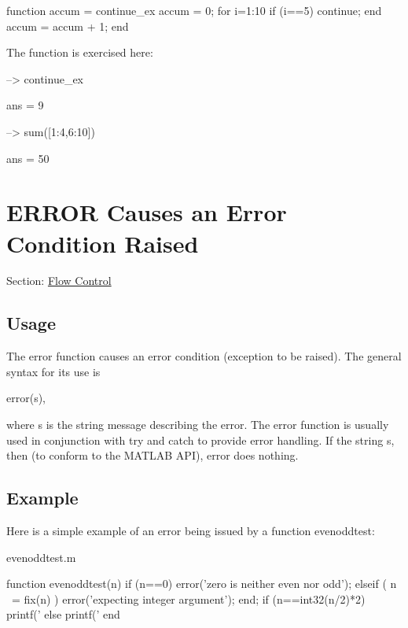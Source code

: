 \begin{DoxyVerbInclude}
function accum = continue_ex
  accum = 0;
  for i=1:10
    if (i==5)
      continue;
    end
    accum = accum + 1; %
  end
\end{DoxyVerbInclude}


The function is exercised here\-:


\begin{DoxyVerbInclude}
--> continue_ex

ans = 
 9 

--> sum([1:4,6:10])

ans = 
 50 
\end{DoxyVerbInclude}
 \hypertarget{flow_error}{}\section{E\-R\-R\-O\-R Causes an Error Condition Raised}\label{flow_error}
Section\-: \hyperlink{sec_flow}{Flow Control} \hypertarget{vtkwidgets_vtkxyplotwidget_Usage}{}\subsection{Usage}\label{vtkwidgets_vtkxyplotwidget_Usage}
The {\ttfamily error} function causes an error condition (exception to be raised). The general syntax for its use is \begin{DoxyVerb}   error(s),
\end{DoxyVerb}
 where {\ttfamily s} is the string message describing the error. The {\ttfamily error} function is usually used in conjunction with {\ttfamily try} and {\ttfamily catch} to provide error handling. If the string {\ttfamily s}, then (to conform to the M\-A\-T\-L\-A\-B A\-P\-I), {\ttfamily error} does nothing. \hypertarget{variables_struct_Example}{}\subsection{Example}\label{variables_struct_Example}
Here is a simple example of an {\ttfamily error} being issued by a function {\ttfamily evenoddtest}\-:

\begin{DoxyVerb}     evenoddtest.m
\end{DoxyVerb}



\begin{DoxyVerbInclude}
function evenoddtest(n)
  if (n==0)
    error('zero is neither even nor odd');
  elseif ( n ~= fix(n) )
    error('expecting integer argument');
  end;
  if (n==int32(n/2)*2)
    printf('%
  else
    printf('%
  end
\end{DoxyVerbInclude}


